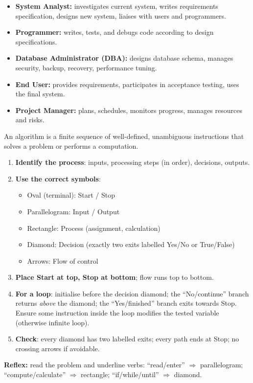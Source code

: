 \documentclass[11pt]{article}
\newcommand{\cle}[1]{{\popxbold\color{popdark}#1}}
\newcounter{popsec}
\newcounter{popsub}
\newcommand{\courssub}[1]{%
  \stepcounter{popsub}%
  \par\vspace{9pt}\noindent{\popxbold\fontsize{11.5}{13}\selectfont\color{popink}{\color{poporange}\thepopsec.\thepopsub}\hspace{6pt}#1}\par\nopagebreak\vspace{4pt}
}
\begin{document}
\begin{aretenir}
\begin{itemize}
\item \textbf{System Analyst:} investigates current system, writes requirements specification, designs new system, liaises with users and programmers.
\item \textbf{Programmer:} writes, tests, and debugs code according to design specifications.
\item \textbf{Database Administrator (DBA):} designs database schema, manages security, backup, recovery, performance tuning.
\item \textbf{End User:} provides requirements, participates in acceptance testing, uses the final system.
\item \textbf{Project Manager:} plans, schedules, monitors progress, manages resources and risks.
\end{itemize}
\end{aretenir}

\courssub{System Design Tools}

\begin{definition}[Algorithm]
An \cle{algorithm} is a finite sequence of well-defined, unambiguous instructions that solves a problem or performs a computation.
\end{definition}

\begin{methode}
\begin{enumerate}
\item \textbf{Identify the process}: inputs, processing steps (in order), decisions, outputs.
\item \textbf{Use the correct symbols}:
\begin{itemize}
\item Oval (terminal): Start / Stop
\item Parallelogram: Input / Output
\item Rectangle: Process (assignment, calculation)
\item Diamond: Decision (exactly two exits labelled Yes/No or True/False)
\item Arrows: Flow of control
\end{itemize}
\item \textbf{Place Start at top, Stop at bottom}; flow runs top to bottom.
\item \textbf{For a loop}: initialise before the decision diamond; the ``No/continue'' branch returns \emph{above} the diamond; the ``Yes/finished'' branch exits towards Stop. Ensure some instruction inside the loop modifies the tested variable (otherwise infinite loop).
\item \textbf{Check}: every diamond has two labelled exits; every path ends at Stop; no crossing arrows if avoidable.
\end{enumerate}
\textbf{Reflex:} read the problem and underline verbs: ``read/enter'' $\Rightarrow$ parallelogram; ``compute/calculate'' $\Rightarrow$ rectangle; ``if/while/until'' $\Rightarrow$ diamond.
\end{methode}
\end{document}
